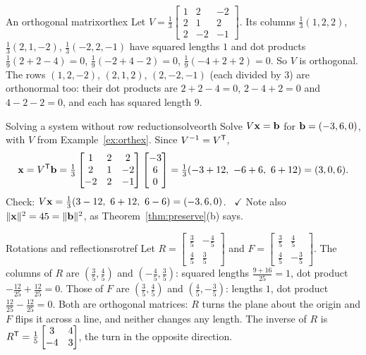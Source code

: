 \documentclass[11pt]{article}
\begin{document}
\begin{exmp}{An orthogonal matrix}{orthex}
Let $V=\tfrac13\begin{bmatrix}1&2&-2\\2&1&2\\2&-2&-1\end{bmatrix}$. Its columns $\tfrac13(1,2,2)$, $\tfrac13(2,1,-2)$, $\tfrac13(-2,2,-1)$ have squared lengths $1$ and dot products $\tfrac19(2+2-4)=0$, $\tfrac19(-2+4-2)=0$, $\tfrac19(-4+2+2)=0$. So $V$ is orthogonal. The rows $(1,2,-2)$, $(2,1,2)$, $(2,-2,-1)$ (each divided by $3$) are orthonormal too: their dot products are $2+2-4=0$, $2-4+2=0$ and $4-2-2=0$, and each has squared length $9$.
\end{exmp}

\begin{exmp}{Solving a system without row reduction}{solveorth}
Solve $V\mathbf{x}=\mathbf{b}$ for $\mathbf{b}=(-3,6,0)$, with $V$ from Example~\ref{ex:orthex}. Since $V^{-1}=V^{\mathsf T}$,
\[
\bv{x}=V\T\bv{b}=\tfrac13\begin{bmatrix}1&2&2\\2&1&-2\\-2&2&-1\end{bmatrix}\begin{bmatrix}-3\\6\\0\end{bmatrix}=\tfrac13(-3+12,\ -6+6,\ 6+12)=(3,0,6).
\]
Check: $V\bv{x}=\tfrac13(3-12,\ 6+12,\ 6-6)=(-3,6,0)$. \ $\checkmark$ Note also $\lVert\mathbf{x}\rVert^2=45=\lVert\mathbf{b}\rVert^2$, as Theorem~\ref{thm:preserve}(b) says.
\end{exmp}

\begin{exmp}{Rotations and reflections}{rotref}
Let $R=\begin{bmatrix}\tfrac35&-\tfrac45\\\tfrac45&\tfrac35\end{bmatrix}$ and $F=\begin{bmatrix}\tfrac35&\tfrac45\\\tfrac45&-\tfrac35\end{bmatrix}$. The columns of $R$ are $(\tfrac35,\tfrac45)$ and $(-\tfrac45,\tfrac35)$: squared lengths $\tfrac{9+16}{25}=1$, dot product $-\tfrac{12}{25}+\tfrac{12}{25}=0$. Those of $F$ are $(\tfrac35,\tfrac45)$ and $(\tfrac45,-\tfrac35)$: lengths $1$, dot product $\tfrac{12}{25}-\tfrac{12}{25}=0$. Both are orthogonal matrices: $R$ turns the plane about the origin and $F$ flips it across a line, and neither changes any length. The inverse of $R$ is $R^{\mathsf T}=\tfrac15\begin{bmatrix}3&4\\-4&3\end{bmatrix}$, the turn in the opposite direction.
\end{exmp}
\end{document}
